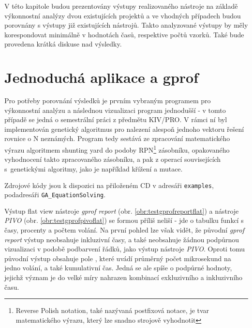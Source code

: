 \documentclass[czech,BP]{thesiskiv}
\begin{document}
V této kapitole budou prezentovány výstupy realizovaného nástroje na základě výkonnostní analýzy dvou existujících projektů a ve vhodných případech budou porovnány s výstupy již existujících nástrojů. Takto analyzované výstupy by měly korespondovat minimálně v hodnotách časů, respektive počtů vzorků. Také bude provedena krátká diskuse nad výsledky.

\section{Jednoduchá aplikace a gprof}\label{sec:overeni1}

Pro potřeby porovnání výsledků je prvním vybraným programem pro výkonnostní analýzu a následnou vizualizaci program jednodušší - v tomto případě se jedná o semestrální práci z předmětu KIV/PRO. V rámci ní byl implementován genetický algoritmus pro nalezení alespoň jednoho vektoru řešení rovnice o N neznámých. Program tedy sestává ze zpracování matematického výrazu algoritmem shunting yard do podoby RPN\footnote{Reverse Polish notation, také nazývaná postfixová notace, je tvar matematického výrazu, který lze snadno strojově vyhodnotit} zásobníku, opakovaného vyhodnocení takto zpracovaného zásobníku, a pak z operací souvisejících s~genetickými algoritmy, jako je například křížení a mutace.

Zdrojové kódy jsou k dispozici na přiloženém CD v adresáři \texttt{examples}, podadresáři \texttt{GA\_EquationSolving}.

Výstup flat view nástroje \emph{gprof report} (obr. \ref{obr:testgprofreportflat}) a nástroje \emph{PIVO} (obr. \ref{obr:testgprofpivoflat}) se formou příliš neliší - jde o tabulku funkcí s časy, procenty a počtem volání. Na první pohled lze však vidět, že původní \emph{gprof report} výstup neobsahuje inkluzivní časy, a také neobsahuje žádnou podpůrnou vizualizaci v podobě podbarvení řádků, jako výstup nástroje \emph{PIVO}. Oproti tomu původní výstup obsahuje pole , které uvádí průměrný počet mikrosekund na jedno volání, a také kumulativní čas. Jedná se ale spíše o podpůrné hodnoty, jejichž význam je do velké míry nahrazen kombinací exkluzivního a inkluzivního času.

\newpage
\vspace*{1cm} %
\end{document}
